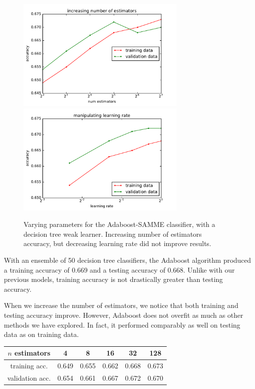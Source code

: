 \documentclass{article}
\begin{document}
\begin{multicols}{2}
\begin{figure}[t]
   \centering
   \includegraphics[width=3.25in]{img/adaB-numEstimators.pdf}\hspace{-.1in}
   \includegraphics[width=3.25in]{img/adaB-learningRate.pdf}
   \caption{Varying parameters for the Adaboost-SAMME classifier,
   with a decision tree weak learner.
   Increasing number of estimators accuracy,
   but decreasing learning rate did not improve results.
   }
   \label{fig:adaB-params}
\end{figure}

With an ensemble of 50 decision tree classifiers,
the Adaboost algorithm produced
a training accuracy of 0.669
and a testing accuracy of 0.668.
Unlike with our previous models,
training accuracy is not drastically greater than
testing accuracy.

When we increase the number of estimators,
we notice that both training and testing accuracy improve.
However, Adaboost does not overfit
as much as other methods we have explored.
In fact, it performed comparably as well on testing data
as on training data.

\begin{center}
    \begin{tabular}{c|ccccc}
        $n$ estimators &
          4 & 8 & 16 & 32 & 128 \\\hline
        training acc. &
          0.649 & 0.655 & 0.662 & 0.668 & 0.673\\
        validation acc. &
          0.654 & 0.661 & 0.667 & 0.672 &0.670
    \end{tabular}
\end{center}


\end{multicols}
\end{document}
